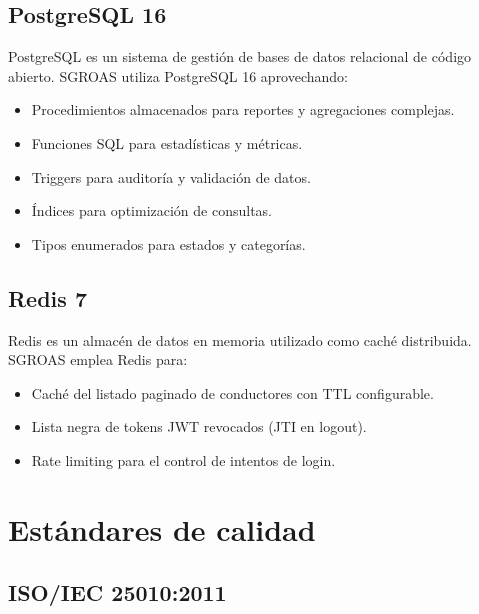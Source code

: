 \subsection{PostgreSQL 16}
\label{sec:postgresql}

PostgreSQL \cite{postgresql} es un sistema de gestión de bases de datos relacional de código abierto. SGROAS utiliza PostgreSQL 16 aprovechando:
\begin{itemize}
  \item Procedimientos almacenados para reportes y agregaciones complejas.
  \item Funciones SQL para estadísticas y métricas.
  \item Triggers para auditoría y validación de datos.
  \item Índices para optimización de consultas.
  \item Tipos enumerados para estados y categorías.
\end{itemize}

\subsection{Redis 7}
\label{sec:redis}

Redis \cite{redis} es un almacén de datos en memoria utilizado como caché distribuida. SGROAS emplea Redis para:
\begin{itemize}
  \item Caché del listado paginado de conductores con TTL configurable.
  \item Lista negra de tokens JWT revocados (JTI en logout).
  \item Rate limiting para el control de intentos de login.
\end{itemize}

\section{Estándares de calidad}
\label{sec:quality}

\subsection{ISO/IEC 25010:2011}
\label{sec:iso25010}

